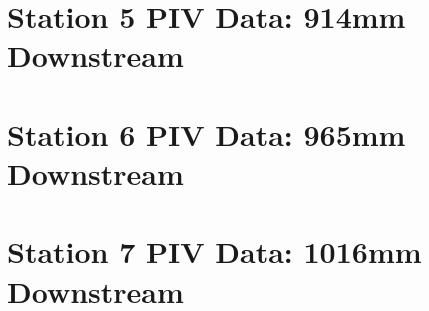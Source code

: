 \section{Station 5 PIV Data: 914mm Downstream}












\section{Station 6 PIV Data: 965mm Downstream}












\section{Station 7 PIV Data: 1016mm Downstream}










